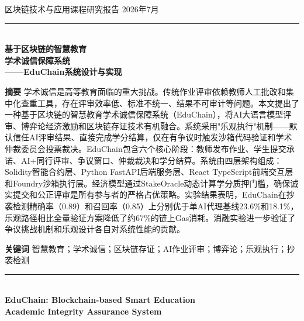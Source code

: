 \documentclass[10.5pt,compsoc]{CjC}
\begin{document}
\thispagestyle{plain}
\thispagestyle{empty}
\pagestyle{CjCheadings}

\onecolumn
\vspace*{-10mm}
\begin{center}
 区块链技术与应用课程研究报告 \hfill 2026年7月

\vspace{1mm}
{\rule{\textwidth}{0.8pt}}\\[3mm]

\vspace{2mm}
{ \textbf{基于区块链的智慧教育}}\\[2mm]
{ \textbf{学术诚信保障系统}}\\[4mm]
{ \textbf{——EduChain系统设计与实现}}\\[6mm]

\parbox{0.92\textwidth}{
\setlength{\baselineskip}{14pt}
\noindent\textbf{摘\quad 要}\quad
学术诚信是高等教育面临的重大挑战。传统作业评审依赖教师人工批改和集中化查重工具，存在评审效率低、标准不统一、结果不可审计等问题。本文提出了一种基于区块链的智慧教育学术诚信保障系统（EduChain），将AI大语言模型评审、博弈论经济激励和区块链存证技术有机融合。系统采用"乐观执行"机制——默认信任AI评审结果、直接完成学分结算，仅在有争议时触发沙箱代码验证和学术仲裁委员会投票裁决。EduChain包含六个核心阶段：教师发布作业、学生提交承诺、AI+同行评审、争议窗口、仲裁裁决和学分结算。系统由四层架构组成：Solidity智能合约层、Python FastAPI后端服务层、React TypeScript前端交互层和Foundry沙箱执行层。经济模型通过StakeOracle动态计算学分质押门槛，确保诚实提交和公正评审是所有参与者的严格占优策略。实验结果表明，EduChain在抄袭检测精确率（0.89）和召回率（0.85）上分别优于单AI代理基线23.6\%和18.1\%，乐观路径相比全量验证方案降低了约67\%的链上Gas消耗。消融实验进一步验证了争议挑战机制和乐观设计各自对系统性能的贡献。
\vspace{1mm}

\noindent\textbf{关键词}\quad
智慧教育；学术诚信；区块链存证；AI作业评审；博弈论；乐观执行；抄袭检测
}

\vspace{3mm}
{\rule{0.5\textwidth}{0.4pt}}\\[3mm]

{\textbf{EduChain: Blockchain-based Smart Education}}\\[1mm]
{\textbf{Academic Integrity Assurance System}}\\[3mm]


\end{center}
\end{document}
